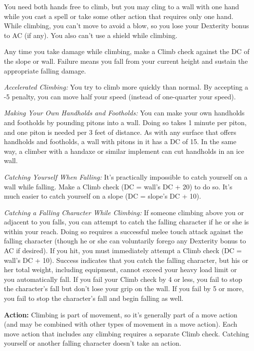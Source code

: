 \documentclass{article}
\begin{document}
\vspace{12pt}
You need both hands free to climb, but you may cling to a wall with one hand while 
you cast a spell or take some other action that requires only one hand. While climbing, 
you can't move to avoid a blow, so you lose your Dexterity bonus to AC (if any). 
You also can't use a shield while climbing.

Any time you take damage while climbing, make a Climb check against the DC of the 
slope or wall. Failure means you fall from your current height and sustain the 
appropriate falling damage.

\textit{Accelerated Climbing: }You try to climb more quickly than normal. By accepting 
a -5 penalty, you can move half your speed (instead of one-quarter your speed).

\textit{Making Your Own Handholds and Footholds: }You can make your own handholds 
and footholds by pounding pitons into a wall. Doing so takes 1 minute per piton, 
and one piton is needed per 3 feet of distance. As with any surface that offers 
handholds and footholds, a wall with pitons in it has a DC of 15. In the same way, 
a climber with a handaxe or similar implement can cut handholds in an ice wall.

\textit{Catching Yourself When Falling: }It's practically impossible to catch yourself 
on a wall while falling. Make a Climb check (DC = wall's DC + 20) to do so. It's 
much easier to catch yourself on a slope (DC = slope's DC + 10).

\textit{Catching a Falling Character While Climbing: }If someone climbing above 
you or adjacent to you falls, you can attempt to catch the falling character if 
he or she is within your reach. Doing so requires a successful melee touch attack 
against the falling character (though he or she can voluntarily forego any Dexterity 
bonus to AC if desired). If you hit, you must immediately attempt a Climb check 
(DC = wall's DC + 10). Success indicates that you catch the falling character, 
but his or her total weight, including equipment, cannot exceed your heavy load 
limit or you automatically fall. If you fail your Climb check by 4 or less, you 
fail to stop the character's fall but don't lose your grip on the wall. If you 
fail by 5 or more, you fail to stop the character's fall and begin falling as well.

\textbf{Action:} Climbing is part of movement, so it's generally part of a move 
action (and may be combined with other types of movement in a move action). Each 
move action that includes any climbing requires a separate Climb check. Catching 
yourself or another falling character doesn't take an action.
\end{document}
